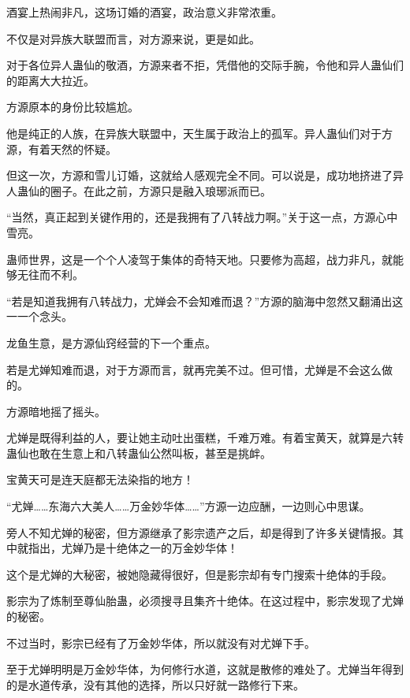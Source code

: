 
\begin{this_body}



酒宴上热闹非凡，这场订婚的酒宴，政治意义非常浓重。

不仅是对异族大联盟而言，对方源来说，更是如此。

对于各位异人蛊仙的敬酒，方源来者不拒，凭借他的交际手腕，令他和异人蛊仙们的距离大大拉近。

方源原本的身份比较尴尬。

他是纯正的人族，在异族大联盟中，天生属于政治上的孤军。异人蛊仙们对于方源，有着天然的怀疑。

但这一次，方源和雪儿订婚，这就给人感观完全不同。可以说是，成功地挤进了异人蛊仙的圈子。在此之前，方源只是融入琅琊派而已。

“当然，真正起到关键作用的，还是我拥有了八转战力啊。”关于这一点，方源心中雪亮。

蛊师世界，这是一个个人凌驾于集体的奇特天地。只要修为高超，战力非凡，就能够无往而不利。

“若是知道我拥有八转战力，尤婵会不会知难而退？”方源的脑海中忽然又翻涌出这一一个念头。

龙鱼生意，是方源仙窍经营的下一个重点。

若是尤婵知难而退，对于方源而言，就再完美不过。但可惜，尤婵是不会这么做的。

方源暗地摇了摇头。

尤婵是既得利益的人，要让她主动吐出蛋糕，千难万难。有着宝黄天，就算是六转蛊仙也敢在生意上和八转蛊仙公然叫板，甚至是挑衅。

宝黄天可是连天庭都无法染指的地方！

“尤婵……东海六大美人……万金妙华体……”方源一边应酬，一边则心中思谋。

旁人不知尤婵的秘密，但方源继承了影宗遗产之后，却是得到了许多关键情报。其中就指出，尤婵乃是十绝体之一的万金妙华体！

这个是尤婵的大秘密，被她隐藏得很好，但是影宗却有专门搜索十绝体的手段。

影宗为了炼制至尊仙胎蛊，必须搜寻且集齐十绝体。在这过程中，影宗发现了尤婵的秘密。

不过当时，影宗已经有了万金妙华体，所以就没有对尤婵下手。

至于尤婵明明是万金妙华体，为何修行水道，这就是散修的难处了。尤婵当年得到的是水道传承，没有其他的选择，所以只好就一路修行下来。


\end{this_body}

